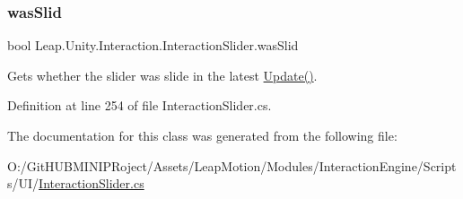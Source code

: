 \subsubsection{\texorpdfstring{wasSlid}{wasSlid}}
{\footnotesize\ttfamily bool Leap.\+Unity.\+Interaction.\+Interaction\+Slider.\+was\+Slid\hspace{0.3cm}{\ttfamily [get]}}



Gets whether the slider was slide in the latest \mbox{\hyperlink{class_leap_1_1_unity_1_1_interaction_1_1_interaction_slider_af07f856388385d64cdd47e6c917308a8}{Update()}}. 



Definition at line 254 of file Interaction\+Slider.\+cs.



The documentation for this class was generated from the following file\+:\begin{DoxyCompactItemize}
\item 
O\+:/\+Git\+H\+U\+B\+M\+I\+N\+I\+P\+Roject/\+Assets/\+Leap\+Motion/\+Modules/\+Interaction\+Engine/\+Scripts/\+U\+I/\mbox{\hyperlink{_interaction_slider_8cs}{Interaction\+Slider.\+cs}}\end{DoxyCompactItemize}
